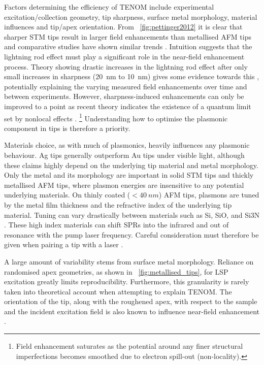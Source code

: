 \documentclass{article}
\begin{document}
Factors determining the efficiency of TENOM include experimental excitation/collection geometry, tip sharpness, surface metal morphology, material influences and tip/apex orientation. From \figurename~\ref{fig:pettinger2012} it is clear that sharper STM tips result in larger field enhancements than metallised AFM tips and comparative studies have shown similar trends \cite{raschke2003, yeo2006, picardi2007}. Intuition suggests that the lightning rod effect must play a significant role in the near-field enhancement process. Theory showing drastic increases in the lightning rod effect after only small increases in sharpness (\SI{20}{nm} to \SI{10}{nm}) gives some evidence towards this \cite{zhang2009, meng2015}, potentially explaining the varying measured field enhancements over time and between experiments. However, sharpness-induced enhancements can only be improved to a point as recent theory indicates the existence of a quantum limit set by nonlocal effects \cite{wiener2012}.%
\footnote{Field enhancement saturates as the potential around any finer structural imperfections becomes smoothed due to electron spill-out (non-locality).}
Understanding how to optimise the plasmonic component in tips is therefore a priority.

Materials choice, as with much of plasmonics, heavily influences any plasmonic behaviour. Ag tips generally outperform Au tips under visible light, although these claims highly depend on the underlying tip material and metal morphology. Only the metal and its morphology are important in solid STM tips and thickly metallised AFM tips, where plasmon energies are insensitive to any potential underlying materials. On thinly coated ($<\SI{40}{nm}$) AFM tips, plasmons are tuned by the metal film thickness \cite{huber2014} and the refractive index of the underlying tip material. Tuning can vary drastically between materials such as Si, SiO, and Si\subs3N \cite{picardi2007, taguchi2009}. These high index materials can shift SPRs into the infrared and out of resonance with the pump laser frequency. Careful consideration must therefore be given when pairing a tip with a laser \cite{yeo2006, yeo2007, cui2007, hayazawa2012}.

A large amount of variability stems from surface metal morphology. Reliance on randomised apex geometries, as shown in \figurename~\ref{fig:metallised_tips}, for LSP excitation greatly limits reproducibility. Furthermore, this granularity is rarely taken into theoretical account when attempting to explain TENOM. The orientation of the tip, along with the roughened apex, with respect to the sample and the incident excitation field is also known to influence near-field enhancement \cite{yeo2006, mino2014}.
\end{document}
